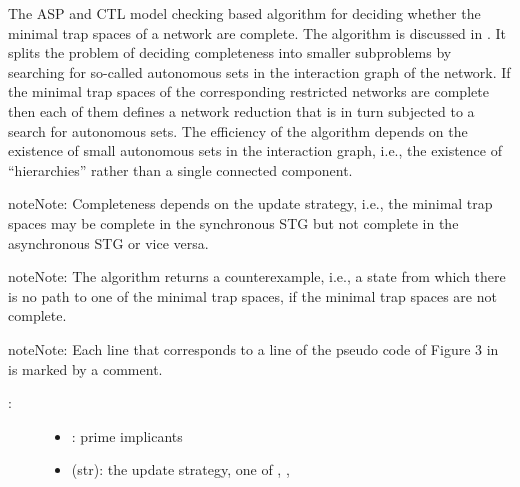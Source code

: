 \documentclass[letterpaper,10pt,english]{sphinxmanual}
\begin{document}
\begin{fulllineitems}
\label{\detokenize{AttractorDetection:PyBoolNet.AttractorDetection.completeness}}
The ASP and CTL model checking based algorithm for deciding whether the minimal trap spaces of a network are complete.
The algorithm is discussed in {\hyperref[\detokenize{Bibliography:klarner2015trap}]{}}.
It splits the problem of deciding completeness into smaller subproblems by searching for so-called autonomous sets in the
interaction graph of the network.
If the minimal trap spaces of the corresponding restricted networks are complete
then each of them defines a network reduction that is in turn subjected to a search for autonomous sets.
The efficiency of the algorithm depends on the existence of small autonomous sets in the interaction graph, i.e.,
the existence of “hierarchies” rather than a single connected component.

\begin{sphinxadmonition}{note}{Note:}
Completeness depends on the update strategy, i.e.,
the minimal trap spaces may be complete in the synchronous STG but not complete in the asynchronous STG or vice versa.
\end{sphinxadmonition}

\begin{sphinxadmonition}{note}{Note:}
The algorithm returns a counterexample, i.e., a state from which there is no path to one of the minimal trap spaces,
if the minimal trap spaces are not complete.
\end{sphinxadmonition}

\begin{sphinxadmonition}{note}{Note:}
Each line that corresponds to a line of the pseudo code of Figure 3 in {\hyperref[\detokenize{Bibliography:klarner2015trap}]{}} is marked by a comment.
\end{sphinxadmonition}
\begin{description}
\item[{:}] \leavevmode\begin{itemize}
\item {} 
: prime implicants

\item {} 
 (str): the update strategy, one of , , 


\end{itemize}
\end{description}
\end{fulllineitems}
\end{document}
